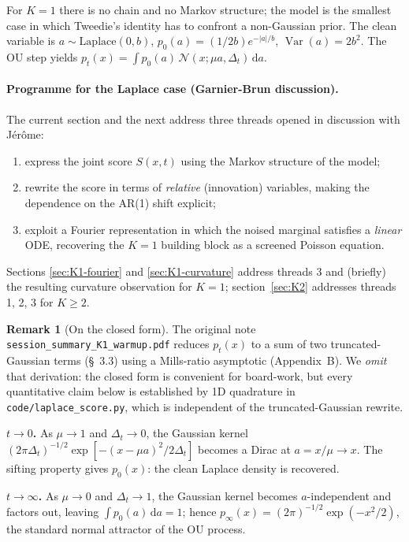 \documentclass[11pt]{article}
\theoremstyle{definition}
\newtheorem{remark}{Remark}
\newcommand{\Var}{\operatorname{Var}}
\newcommand{\Detl}{\Delta_t}
\newcommand{\score}{S(x, t)}
\begin{document}
For \(K = 1\) there is no chain and no Markov structure; the model
is the smallest case in which Tweedie's identity has to confront a
non-Gaussian prior. The clean variable is
\(a \sim \mathrm{Laplace}(0, b)\), \(p_0(a) = (1/2 b) e^{-|a|/b}\),
\(\Var(a) = 2 b^2\). The OU step yields
\(p_t(x) = \int p_0(a)\, \mathcal N(x; \mu a, \Detl)\, \mathrm da\).

\paragraph{Programme for the Laplace case (Garnier-Brun discussion).}
The current section and the next address three threads opened in
discussion with J\'er\^ome:
\begin{enumerate}[leftmargin=1.6em, topsep=2pt, itemsep=2pt]
\item express the joint score \(\score\) using the Markov structure of
the model;
\item rewrite the score in terms of \emph{relative} (innovation)
variables, making the dependence on the AR(1) shift explicit;
\item exploit a Fourier representation in which the noised marginal
satisfies a \emph{linear} ODE, recovering the \(K = 1\) building
block as a screened Poisson equation.
\end{enumerate}
Sections \ref{sec:K1-fourier} and \ref{sec:K1-curvature} address
threads 3 and (briefly) the resulting curvature observation for
\(K = 1\); section~\ref{sec:K2} addresses threads 1, 2, 3 for
\(K \geq 2\).

\begin{remark}[On the closed form]
The original note \texttt{session\_summary\_K1\_warmup.pdf} reduces
\(p_t(x)\) to a sum of two truncated-Gaussian terms (\S~3.3) using a
Mills-ratio asymptotic (Appendix~B). We \emph{omit} that derivation:
the closed form is convenient for board-work, but every quantitative
claim below is established by 1D quadrature in
\texttt{code/laplace\_score.py}, which is independent of the
truncated-Gaussian rewrite.
\end{remark}

\begin{computation}
\textbf{\(t \to 0\).} As \(\mu \to 1\) and \(\Detl \to 0\), the
Gaussian kernel \((2 \pi \Detl)^{-1/2} \exp[-(x - \mu a)^2 / 2 \Detl]\)
becomes a Dirac at \(a = x / \mu \to x\). The sifting property gives
\(p_0(x)\): the clean Laplace density is recovered.

\textbf{\(t \to \infty\).} As \(\mu \to 0\) and \(\Detl \to 1\), the
Gaussian kernel becomes \(a\)-independent and factors out, leaving
\(\int p_0(a)\, \mathrm da = 1\); hence \(p_\infty(x) = (2 \pi)^{-1/2}
\exp(-x^2 / 2)\), the standard normal attractor of the OU process.
\end{computation}
\end{document}
